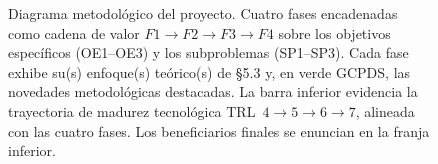 \begin{figure}[t]
\caption{Diagrama metodológico del proyecto. Cuatro fases encadenadas como cadena de valor $F1\rightarrow F2\rightarrow F3\rightarrow F4$ sobre los objetivos específicos (OE1--OE3) y los subproblemas (SP1--SP3). Cada fase exhibe su(s) enfoque(s) teórico(s) de §5.3 y, en \textcolor{verdeGCPDS}{verde GCPDS}, las novedades metodológicas destacadas. La barra inferior evidencia la trayectoria de madurez tecnológica TRL~$4\!\rightarrow\!5\!\rightarrow\!6\!\rightarrow\!7$, alineada con las cuatro fases. Los beneficiarios finales se enuncian en la franja inferior.}
\label{fig:diagrama-metodologico}
\end{figure}
